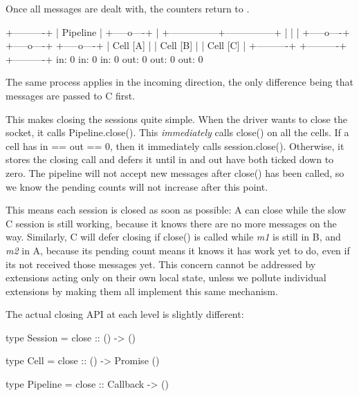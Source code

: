 Once all messages are dealt with, the counters return to {}.

\begin{DoxyVerb}                          +----------+
                          | Pipeline |
                          +-----o----+
                                |
                +---------------+---------------+
                |               |               |
          +-----o----+    +-----o----+    +-----o----+
          | Cell [A] |    | Cell [B] |    | Cell [C] |
          +----------+    +----------+    +----------+
             in: 0           in: 0           in: 0
            out: 0          out: 0          out: 0
\end{DoxyVerb}


The same process applies in the {\ttfamily incoming} direction, the only difference being that messages are passed to {\ttfamily C} first.

This makes closing the sessions quite simple. When the driver wants to close the socket, it calls {\ttfamily Pipeline.\+close()}. This {\itshape immediately} calls {\ttfamily close()} on all the cells. If a cell has {\ttfamily in == out == 0}, then it immediately calls {\ttfamily session.\+close()}. Otherwise, it stores the closing call and defers it until {\ttfamily in} and {\ttfamily out} have both ticked down to zero. The pipeline will not accept new messages after {\ttfamily close()} has been called, so we know the pending counts will not increase after this point.

This means each session is closed as soon as possible\+: {\ttfamily A} can close while the slow {\ttfamily C} session is still working, because it knows there are no more messages on the way. Similarly, {\ttfamily C} will defer closing if {\ttfamily close()} is called while {\itshape m1} is still in {\ttfamily B}, and {\itshape m2} in {\ttfamily A}, because its pending count means it knows it has work yet to do, even if it\textquotesingle{}s not received those messages yet. This concern cannot be addressed by extensions acting only on their own local state, unless we pollute individual extensions by making them all implement this same mechanism.

The actual closing A\+PI at each level is slightly different\+: \begin{DoxyVerb}type Session = {
  close :: () -> ()
}

type Cell = {
  close :: () -> Promise ()
}

type Pipeline = {
  close :: Callback -> ()
}
\end{DoxyVerb}


